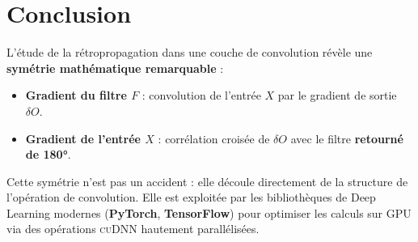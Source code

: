 \documentclass[12pt, a4paper]{article}
\begin{document}
\section*{Conclusion}

L'étude de la rétropropagation dans une couche de convolution révèle une
\textbf{symétrie mathématique remarquable} :

\begin{resultbox}
\begin{itemize}[noitemsep, leftmargin=1.5cm]
    \item \textbf{Gradient du filtre $F$} : convolution de l'entrée $X$
          par le gradient de sortie $\delta O$.
    \item \textbf{Gradient de l'entrée $X$} : corrélation croisée de $\delta O$
          avec le filtre \textbf{retourné de 180°}.
\end{itemize}
Cette symétrie n'est pas un accident : elle découle directement de la structure
de l'opération de convolution. Elle est exploitée par les bibliothèques de
Deep Learning modernes (\textbf{PyTorch}, \textbf{TensorFlow}) pour optimiser
les calculs sur GPU via des opérations \textsc{cuDNN} hautement parallélisées.
\end{resultbox}
\end{document}
